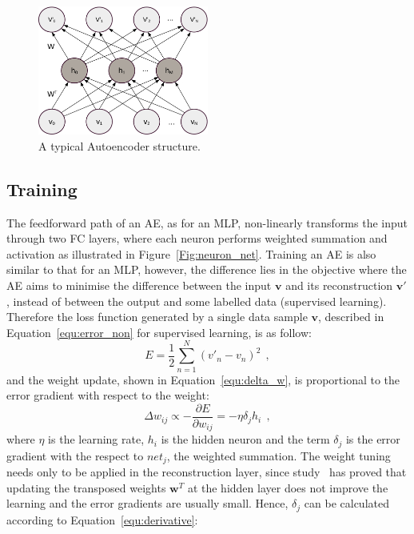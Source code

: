 \begin{figure}
	\centering
	\includegraphics[width=0.5\textwidth]{pics_sdlm/AE.pdf}
	\caption{A typical Autoencoder structure.}
	\label{fig:AE}
\end{figure}


\subsection{Training}
The feedforward path of an AE, as for an MLP, non-linearly transforms the input through two FC layers, where each neuron performs weighted summation and activation as illustrated in Figure~\ref{Fig:neuron_net}.
Training an AE is also similar to that for an MLP, however, the difference lies in the objective where the AE aims to minimise the difference between the input $\mathbf{v}$ and its reconstruction $\mathbf{v'}$, instead of between the output and some labelled data (supervised learning).
Therefore the loss function generated by a single data sample $\mathbf{v}$, described in Equation~\ref{equ:error_non} for supervised learning, is as follow:
\begin{equation}
E = \frac{1}{2}\sum_{n=1}^N (v'_{n}-v_{n})^{2}~~,
\end{equation}
and the weight update, shown in Equation~\ref{equ:delta_w}, is proportional to the error gradient with respect to the weight:
\begin{equation}
\Delta w_{ij} \propto -\frac{\partial E}{\partial w_{ij}} = -\eta \delta_j h_i~~,
\end{equation}
where $\eta$ is the learning rate, $h_i$ is the hidden neuron and the term $\delta_j$ is the error gradient with the respect to $net_j$, the weighted summation.
The weight tuning needs only to be applied in the reconstruction layer, since study~\citep{xu1993least} has proved that updating the transposed weights $\mathbf{w}^T$ at the hidden layer does not improve the learning and the error gradients are usually small.
Hence, $\delta_j$  can be calculated according to Equation~\ref{equ:derivative}:
